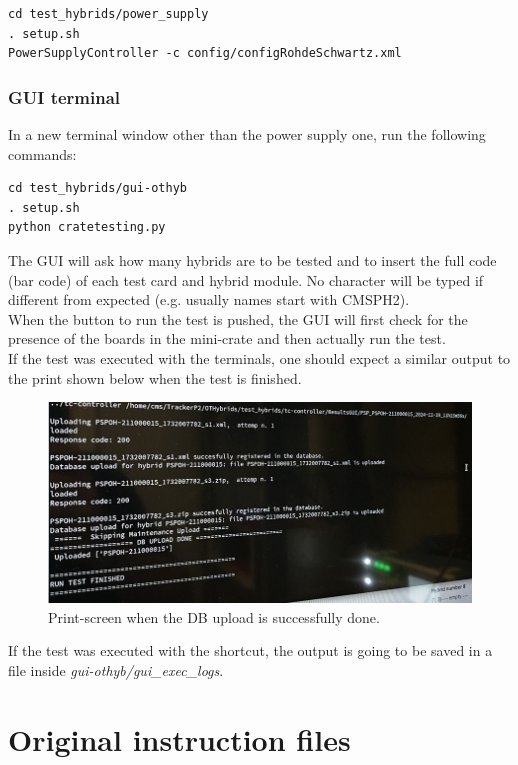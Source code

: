 \documentclass[10pt,a4paper]{article}
\begin{document}
\begin{framed}
\begin{verbatim}
cd test_hybrids/power_supply
. setup.sh
PowerSupplyController -c config/configRohdeSchwartz.xml
\end{verbatim}
\end{framed}

\subsubsection{GUI terminal}

In a new terminal window other than the power supply one, run the following commands:

\begin{framed}
\begin{verbatim}
cd test_hybrids/gui-othyb
. setup.sh 
python cratetesting.py
\end{verbatim}
\end{framed}

\newpage

The GUI will ask how many hybrids are to be tested and to insert the full code (bar code) of each test card and hybrid module.
No character will be typed if different from expected (e.g. usually names start with CMSPH2). \\
When the button to run the test is pushed, the GUI will first check for the presence of the boards in the mini-crate and then actually run the test. \\

If the test was executed with the terminals, one should expect a similar output to the print shown below when the test is finished. 

\begin{figure}[h!]
\centering
 \includegraphics[width=1.0\linewidth]{Pictures/DBupload-success.jpg} 
  \caption{Print-screen when the DB upload is successfully done.}
  \label{DBupload}
\end{figure}

If the test was executed with the shortcut, the output is going to be saved in a file inside \emph{gui-othyb/gui\_exec\_logs}.

\newpage

\appendix

\appendixpage
\section{Original instruction files}


\end{document}
